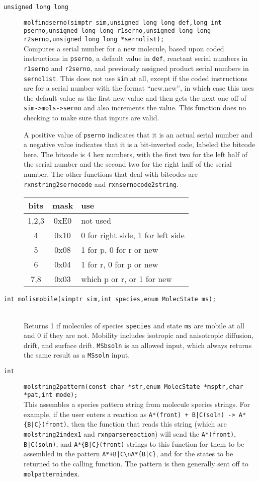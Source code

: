 \documentclass {scrbook}
\newcommand {\ttt} {\texttt}
\begin{document}
\begin{description}
\item[\ttt{unsigned long long}]
\ttt{molfindserno(simptr sim,unsigned long long def,long int pserno,unsigned long long r1serno,unsigned long long r2serno,unsigned long long *sernolist);}
\hfill \\
Computes a serial number for a new molecule, based upon coded instructions in \ttt{pserno}, a default value in \ttt{def}, reactant serial numbers in \ttt{r1serno} and \ttt{r2serno}, and previously assigned product serial numbers in \ttt{sernolist}. This does not use \ttt{sim} at all, except if the coded instructions are for a serial number with the format ``new.new'', in which case this uses the default value as the first new value and then gets the next one off of \ttt{sim->mols->serno} and also increments the value. This function does no checking to make sure that inputs are valid.

A positive value of \ttt{pserno} indicates that it is an actual serial number and a negative value indicates that it is a bit-inverted code, labeled the bitcode here. The bitcode is 4 hex numbers, with the first two for the left half of the serial number and the second two for the right half of the serial number. The other functions that deal with bitcodes are \ttt{rxnstring2sernocode} and \ttt{rxnsernocode2string}.

\begin{longtable}[c]{ccl}
bits & mask & use\\
\hline
1,2,3 & 0xE0 & not used\\
4 & 0x10 & 0 for right side, 1 for left side\\
5 & 0x08 & 1 for p, 0 for r or new\\
6 & 0x04 & 1 for r, 0 for p or new\\
7,8 & 0x03 & which p or r, or 1 for new
\end{longtable}

\item[\ttt{int molismobile(simptr sim,int species,enum MolecState ms);}]
\hfill \\
Returns 1 if molecules of species \ttt{species} and state \ttt{ms} are mobile at all and 0 if they are not. Mobility includes isotropic and anisotropic diffusion, drift, and surface drift. \ttt{MSbsoln} is an allowed input, which always returns the same result as a \ttt{MSsoln} input.

\item[\ttt{int}]
\ttt{molstring2pattern(const char *str,enum MolecState *msptr,char *pat,int mode);}
\hfill \\
This assembles a species pattern string from molecule species strings. For example, if the user enters a reaction as \ttt{A*(front) + B|C(soln) -> A*\{B|C\}(front)}, then the function that reads this string (which are \ttt{molstring2index1} and \ttt{rxnparsereaction}) will send the \ttt{A*(front)}, \ttt{B|C(soln)}, and \ttt{A*\{B|C\}(front)} strings to this function for them to be assembled in the pattern \ttt{A*+B|C\textbackslash nA*\{B|C\}}, and for the states to be returned to the calling function. The pattern is then generally sent off to \ttt{molpatternindex}.


\end{description}
\end{document}
